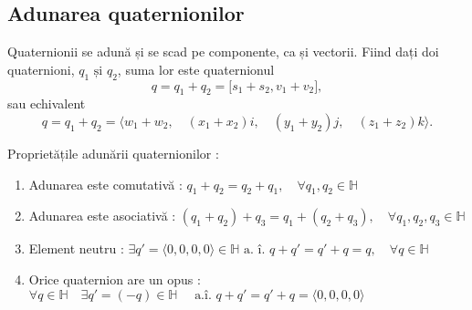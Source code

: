 \subsection{Adunarea quaternionilor}
\label{ch1:quaternions:addition}
Quaternionii se adună și se scad pe componente, ca și vectorii.
Fiind dați doi quaternioni, $q_1 \text{ și } q_2$, suma lor este quaternionul
\begin{equation}
q = q_1 + q_2 = \lbrack s_1 + s_2, v_1 + v_2 \rbrack,
\end{equation} sau echivalent
\begin{equation}
q = q_1 + q_2 = \langle w_1 + w_2, \quad (x_1 + x_2)i, \quad (y_1 + y_2)j, 
\quad (z_1 + z_2)k \rangle.
\end{equation}

\noindent

Proprietățile adunării quaternionilor :
\begin{enumerate}
    \item Adunarea este comutativă : 
    $q_1 + q_2 = q_2 + q_1, \quad \forall q_1, q_2 \in \mathbb{H}$
    \item Adunarea este asociativă :
    $(q_1 + q_2) + q_3 = q_1 + (q_2 + q_3), \quad \forall q_1, q_2, q_3
    \in \mathbb{H}$
    \item Element neutru : $\exists q' = \langle 0, 0, 0, 0 \rangle \in 
    \mathbb{H} \text{ a. î. } q + q' = q' + q = q, \quad \forall q \in
    \mathbb{H}$ 
    \item Orice quaternion are un opus : $\forall q \in \mathbb{H} \quad
    \exists q' = (-q) \in \mathbb{H} \quad \text{ a.î. } q + q' = q' + q = 
    \langle 0, 0, 0, 0 \rangle$
\end{enumerate}

